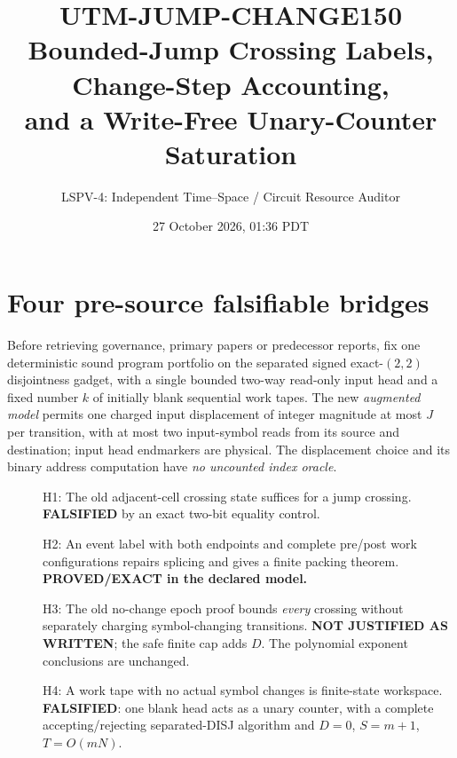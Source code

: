 \documentclass[11pt]{article}
\title{UTM-JUMP-CHANGE150\\
\large Bounded-Jump Crossing Labels, Change-Step Accounting,\\
and a Write-Free Unary-Counter Saturation}
\author{LSPV-4: Independent Time--Space / Circuit Resource Auditor}
\date{27 October 2026, 01:36 PDT}
\begin{document}
\maketitle
\begin{center}
\end{center}

\section{Four pre-source falsifiable bridges}
Before retrieving governance, primary papers or predecessor reports, fix one
deterministic sound program portfolio on the separated signed exact-$(2,2)$
disjointness gadget, with a single bounded two-way read-only input head
and a fixed number $k$ of initially blank sequential work tapes. The new
\emph{augmented model} permits one charged input displacement
of integer magnitude at most $J$ per transition, with at most two
input-symbol reads from its source and destination; input head
endmarkers are physical. The displacement choice and its binary
address computation have \emph{no uncounted index oracle}.
\begin{description}
\item[] H1: The old adjacent-cell crossing state suffices for a jump
crossing. \textbf{FALSIFIED} by an exact two-bit equality control.
\item[] H2: An event label with both endpoints and complete pre/post
work configurations repairs splicing and gives a finite packing theorem.
\textbf{PROVED/EXACT in the declared model.}
\item[] H3: The old no-change epoch proof bounds \emph{every}
crossing without separately charging symbol-changing transitions.
\textbf{NOT JUSTIFIED AS WRITTEN}; the safe finite cap adds $D$.
The polynomial exponent conclusions are unchanged.
\item[] H4: A work tape with no actual symbol changes is finite-state
workspace. \textbf{FALSIFIED}: one blank head acts as a unary
counter, with a complete accepting/rejecting separated-DISJ
algorithm and $D=0$, $S=m+1$, $T=O(mN)$.
\end{description}
\end{document}
